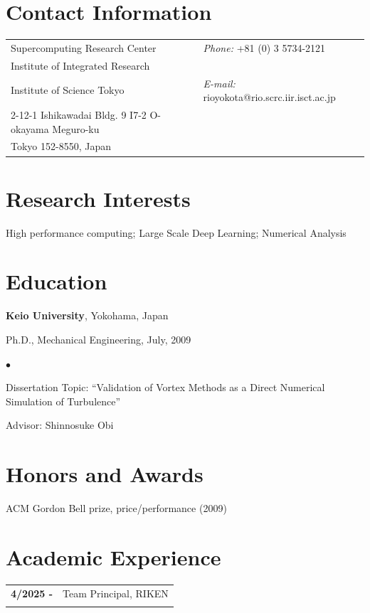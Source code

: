 \documentclass[margin,line]{cv}
\newenvironment{list1}{
  \begin{list}{\ding{113}}{%
      \setlength{\itemsep}{0in}
      \setlength{\parsep}{0in} \setlength{\parskip}{0in}
      \setlength{\topsep}{0in} \setlength{\partopsep}{0in} 
      \setlength{\leftmargin}{0.17in}}}{\end{list}}
\newenvironment{list2}{
  \begin{list}{$\bullet$}{%
      \setlength{\itemsep}{0in}
      \setlength{\parsep}{0in} \setlength{\parskip}{0in}
      \setlength{\topsep}{0in} \setlength{\partopsep}{0in} 
      \setlength{\leftmargin}{0.2in}}}{\end{list}}
\begin{document}

\begin{resume}
\section{\sc Contact Information}
\vspace{.05in}
\begin{tabular}{@{}p{3.8in}p{4in}}
Supercomputing Research Center  & {\it Phone:}  +81 (0) 3 5734-2121\\
Institute of Integrated Research & \\
Institute of Science Tokyo & {\it E-mail:} rioyokota@rio.scrc.iir.isct.ac.jp \\
2-12-1 Ishikawadai Bldg. 9 I7-2 O-okayama Meguro-ku \\
Tokyo 152-8550, Japan
\end{tabular}


\section{\sc Research Interests}
High performance computing; Large Scale Deep Learning; Numerical Analysis

\section{\sc Education}
{\bf Keio University}, Yokohama, Japan\\
\vspace*{-.1in}
\begin{list1}
\item[] Ph.D., Mechanical Engineering, July, 2009
\begin{list2}
\vspace*{.05in}
\item Dissertation Topic:  ``Validation of Vortex Methods as a Direct Numerical Simulation of Turbulence'' 
\item Advisor:  Shinnosuke Obi
\end{list2}
\end{list1}

\section{\sc Honors and Awards} 
ACM Gordon Bell prize, price/performance (2009)

\section{\sc Academic Experience}
\begin{tabular}{ll}
{\bf 4/2025 - } & Team Principal, RIKEN\\ \\


\end{tabular}
\end{resume}
\end{document}
